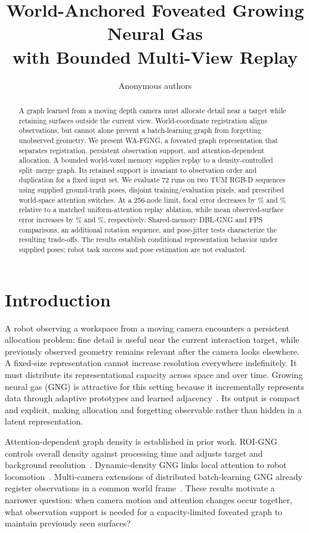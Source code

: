 \documentclass[letterpaper,10pt,conference]{template/ieeeconf}
\title{World-Anchored Foveated Growing Neural Gas\\with Bounded Multi-View Replay}
\author{Anonymous authors}
\begin{document}
\maketitle
\thispagestyle{empty}\pagestyle{empty}
\begin{abstract}
A graph learned from a moving depth camera must allocate detail near a target while retaining surfaces outside the current view. World-coordinate registration aligns observations, but cannot alone prevent a batch-learning graph from forgetting unobserved geometry. We present WA-FGNG, a foveated graph representation that separates registration, persistent observation support, and attention-dependent allocation. A bounded world-voxel memory supplies replay to a density-controlled split--merge graph. Its retained support is invariant to observation order and duplication for a fixed input set. We evaluate 72 runs on two TUM RGB-D sequences using supplied ground-truth poses, disjoint training/evaluation pixels, and prescribed world-space attention switches. At a 256-node limit, focal error decreases by \DeskFocusGain\% and \XyzFocusGain\% relative to a matched uniform-attention replay ablation, while mean observed-surface error increases by \DeskGlobalCost\% and \XyzGlobalCost\%, respectively. Shared-memory DBL-GNG and FPS comparisons, an additional rotation sequence, and pose-jitter tests characterize the resulting trade-offs. The results establish conditional representation behavior under supplied poses; robot task success and pose estimation are not evaluated.
\end{abstract}

\section{Introduction}
A robot observing a workspace from a moving camera encounters a persistent allocation problem: fine detail is useful near the current interaction target, while previously observed geometry remains relevant after the camera looks elsewhere. A fixed-size representation cannot increase resolution everywhere indefinitely. It must distribute its representational capacity across space and over time. Growing neural gas (GNG) is attractive for this setting because it incrementally represents data through adaptive prototypes and learned adjacency~\cite{fritzke1995gng}. Its output is compact and explicit, making allocation and forgetting observable rather than hidden in a latent representation.

Attention-dependent graph density is established in prior work. ROI-GNG controls overall density against processing time and adjusts target and background resolution~\cite{toda2019roi}. Dynamic-density GNG links local attention to robot locomotion~\cite{saputra2023attention}. Multi-camera extensions of distributed batch-learning GNG already register observations in a common world frame~\cite{siow2024multicamera}. These results motivate a narrower question: when camera motion and attention changes occur together, what observation support is needed for a capacity-limited foveated graph to maintain previously seen surfaces?
\end{document}
